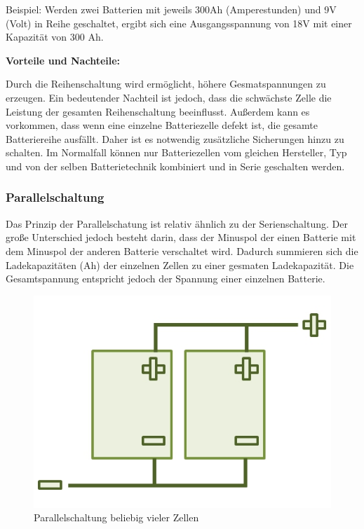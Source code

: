Beispiel: Werden zwei Batterien mit jeweils 300Ah (Amperestunden) und 9V (Volt) in Reihe geschaltet, ergibt sich eine Ausgangsspannung von 18V mit einer Kapazität von 300 Ah. \medskip

\textbf{Vorteile und Nachteile:}

Durch die Reihenschaltung wird ermöglicht, höhere Gesmatspannungen zu erzeugen. Ein bedeutender Nachteil ist jedoch, dass die schwächste Zelle die Leistung der gesamten Reihenschaltung beeinflusst. Außerdem kann es vorkommen, dass wenn eine einzelne Batteriezelle defekt ist, die gesamte Batteriereihe ausfällt. Daher ist es notwendig zusätzliche Sicherungen hinzu zu schalten. Im Normalfall können nur Batteriezellen vom gleichen Hersteller, Typ und von der selben Batterietechnik kombiniert und in Serie geschalten werden.
\newpage

\subsubsection{Parallelschaltung}
Das Prinzip der Parallelschatung ist relativ ähnlich zu der Serienschaltung. Der große Unterschied jedoch besteht darin, dass der Minuspol der einen Batterie mit dem Minuspol der anderen Batterie verschaltet wird. Dadurch summieren sich die Ladekapazitäten (Ah) der einzelnen Zellen zu einer gesmaten Ladekapazität. Die Gesamtspannung entspricht jedoch der Spannung einer einzelnen Batterie. 

\begin{figure}[H]
	\begin{center}
		\includegraphics[scale=1.0]{figures/Akku/ParallelschaltungzweierBatterien.org.jpg}
		\caption{Parallelschaltung beliebig vieler Zellen}
	\end{center}
\end{figure}

